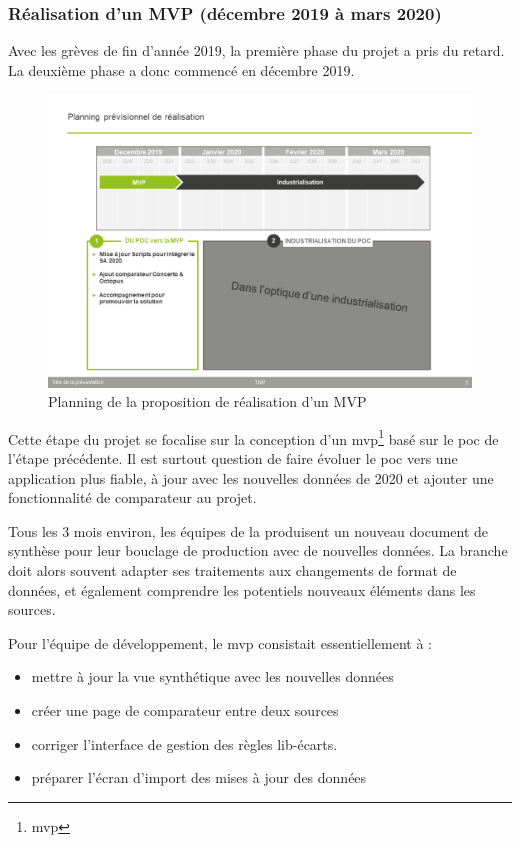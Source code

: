 \subsubsection{Réalisation d'un MVP (décembre 2019 à mars 2020)}

Avec les grèves de fin d'année 2019, la première phase du projet a pris du retard. La deuxième phase a donc commencé en décembre 2019.

\begin{figure}[H]
    \centering
    \includegraphics[width=1\linewidth]{img/planning-decembre-mars-2020-MVP.png}
    \caption{Planning de la proposition de réalisation d’un MVP}
\end{figure}

Cette étape du projet se focalise sur la conception d'un 
\gls{mvp}\footnote{\glsdesc{mvp}}
basé sur le \gls{poc} de l'étape précédente. Il est surtout question de faire évoluer le \gls{poc} vers une application plus fiable, à jour avec les nouvelles données de 2020 et ajouter une fonctionnalité de comparateur au projet.

Tous les 3 mois environ, les équipes de la \sncf produisent un nouveau document de synthèse pour leur bouclage de production avec de nouvelles données. La branche \ds doit alors souvent adapter ses traitements aux changements de format de données, et également comprendre les potentiels nouveaux éléments dans les sources.

Pour l'équipe de développement, le \gls{mvp} consistait essentiellement à :

\begin{itemize}
    \item mettre à jour la vue synthétique avec les nouvelles données
    \item créer une page de comparateur entre deux sources
    \item corriger l'interface de gestion des règles lib-écarts.
    \item préparer l'écran d'import des mises à jour des données
\end{itemize}

